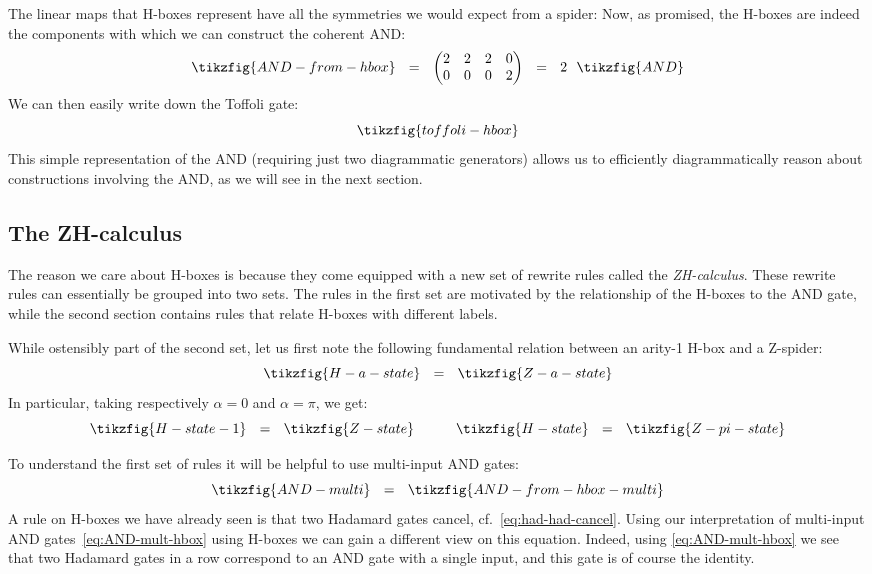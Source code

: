 \documentclass[a4paper,onecolumn,superscriptaddress,11pt,%
				unpublished,%
				allowfontchageintitle,%
				]{quantumarticle}
\begin{document}
The linear maps that H-boxes represent have all the symmetries we would expect from a spider:
Now, as promised, the H-boxes are indeed the components with which we can construct the coherent AND:
\begin{equation}
	\tikzfig{AND-from-hbox} \ \ = \ \ 
	\begin{pmatrix}
		2&2&2&0\\
		0&0&0&2
	\end{pmatrix}
	\ \ = \ \ 2 \ \ \tikzfig{AND}
\end{equation}
We can then easily write down the Toffoli gate:
\begin{equation}
	\tikzfig{toffoli-hbox}
\end{equation}
This simple representation of the AND (requiring just two diagrammatic generators) allows us to efficiently diagrammatically reason about constructions involving the AND, as we will see in the next section.

\subsection{The ZH-calculus}\label{sec:ZH-calculus}

The reason we care about H-boxes is because they come equipped with a new set of rewrite rules called the \emph{ZH-calculus}. 
These rewrite rules can essentially be grouped into two sets. The rules in the first set are motivated by the relationship of the H-boxes to the AND gate, while the second section contains rules that relate H-boxes with different labels.

While ostensibly part of the second set, let us first note the following fundamental relation between an arity-1 H-box and a Z-spider:
\begin{equation}\label{eq:H-state-as-Z}
	\tikzfig{H-a-state} \ \ = \ \ \tikzfig{Z-a-state}
\end{equation}
In particular, taking respectively $\alpha = 0$ and $\alpha = \pi$, we get:
\begin{equation}\label{eq:H-state-unit}
	\tikzfig{H-state-1} \ \ = \ \ \tikzfig{Z-state} \qquad \quad \tikzfig{H-state} \ \ = \ \ \tikzfig{Z-pi-state}
\end{equation}

To understand the first set of rules it will be helpful to use multi-input AND gates:
\begin{equation}\label{eq:AND-mult-hbox}
	\tikzfig{AND-multi} \ \ = \ \ \tikzfig{AND-from-hbox-multi}
\end{equation}
A rule on H-boxes we have already seen is that two Hadamard gates cancel, cf.~\eqref{eq:had-had-cancel}. Using our interpretation of multi-input AND gates~\eqref{eq:AND-mult-hbox} using H-boxes we can gain a different view on this equation. Indeed, using \eqref{eq:AND-mult-hbox} we see that two Hadamard gates in a row correspond to an AND gate with a single input, and this gate is of course the identity.
\end{document}
